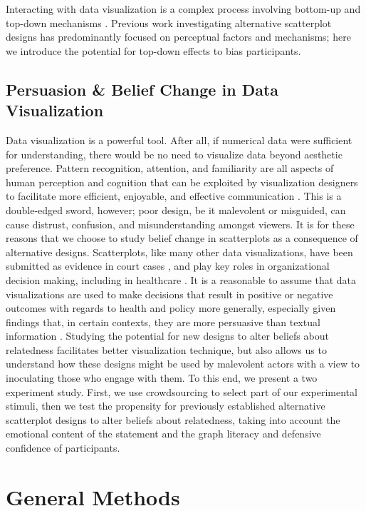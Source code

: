 \documentclass[manuscript,screen,review,anonymous]{acmart}
\begin{document}
Interacting with data visualization is a complex process involving
bottom-up and top-down mechanisms
\citep{shah_2011, franconeri_2021, xiong_2022}. Previous work
investigating alternative scatterplot designs has predominantly focused
on perceptual factors and mechanisms; here we introduce the potential
for top-down effects to bias participants.

\subsection{Persuasion \& Belief Change in Data
Visualization}\label{sec-persuasion}

Data visualization is a powerful tool. After all, if numerical data were
sufficient for understanding, there would be no need to visualize data
beyond aesthetic preference. Pattern recognition, attention, and
familiarity are all aspects of human perception and cognition that can
be exploited by visualization designers to facilitate more efficient,
enjoyable, and effective communication \citep{franconeri_2021}. This is
a double-edged sword, however; poor design, be it malevolent or
misguided, can cause distrust, confusion, and misunderstanding amongst
viewers. It is for these reasons that we choose to study belief change
in scatterplots as a consequence of alternative designs. Scatterplots,
like many other data visualizations, have been submitted as evidence in
court cases \citep{bobko_1979}, and play key roles in organizational
decision making, including in healthcare \citep{poly_2019}. It is a
reasonable to assume that data visualizations are used to make decisions
that result in positive or negative outcomes with regards to health and
policy more generally, especially given findings that, in certain
contexts, they are more persuasive than textual information
\citep{pandey_2014}. Studying the potential for new designs to alter
beliefs about relatedness facilitates better visualization technique,
but also allows us to understand how these designs might be used by
malevolent actors with a view to inoculating those who engage with them.
To this end, we present a two experiment study. First, we use
crowdsourcing to select part of our experimental stimuli, then we test
the propensity for previously established alternative scatterplot
designs to alter beliefs about relatedness, taking into account the
emotional content of the statement and the graph literacy and defensive
confidence of participants.

\section{General Methods}\label{sec-general-methods}
\end{document}
